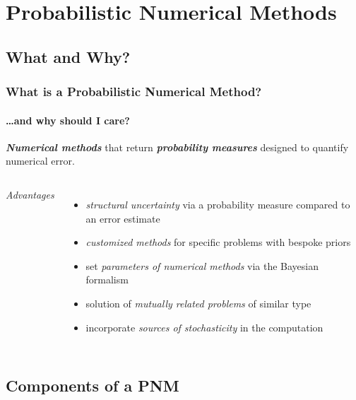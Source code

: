 \documentclass[10pt,usepdftitle=false,aspectratio=169]{beamer}
\begin{document}
\section{Probabilistic Numerical Methods}

\subsection{What and Why?}

\begin{frame}\frametitle{What is a Probabilistic Numerical Method?}
	\framesubtitle{\dots and why should I care?}

	\begin{center}
		\emph{\bf Numerical methods} that return \emph{\bf probability measures} designed to quantify numerical error.
	\end{center}

	\begin{columns}


		\emph{Advantages}
		\begin{itemize}
			\item \textit{structural uncertainty} via a probability measure compared to an error estimate
			\item \textit{customized methods} for specific problems with bespoke priors
			\item set \textit{parameters of numerical methods} via the Bayesian formalism
			\item solution of \textit{mutually related problems} of similar type
			\item incorporate \textit{sources of stochasticity} in the computation
		\end{itemize}


	\end{columns}

	\vfill


\end{frame}

\subsection{Components of a PNM}
\end{document}
